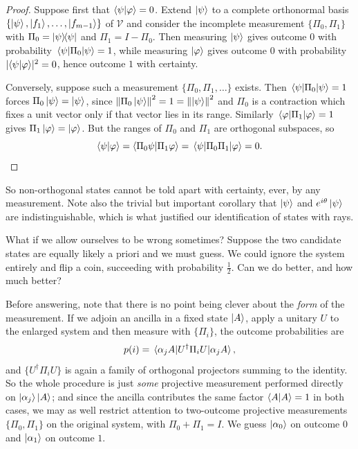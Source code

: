 \documentclass[a4paper]{scrartcl}
\newcommand{\Vs}{\mathcal{V}}
\begin{document}
\begin{proof}
	Suppose first that $\ip{\psi}{\varphi} = 0$. Extend $\ket{\psi}$ to a complete orthonormal basis $\{\ket{\psi}, \ket{f_1},\dots,\ket{f_{m-1}}\}$ of $\Vs$ and consider the incomplete measurement $\{\Pi_0, \Pi_1\}$ with $\Pi_0 = \op{\psi}{\psi}$ and $\Pi_1 = I - \Pi_0$. Then measuring $\ket{\psi}$ gives outcome $0$ with probability $\mel{\psi}{\Pi_0}{\psi} = 1$, while measuring $\ket{\varphi}$ gives outcome $0$ with probability $\abs{\ip{\psi}{\varphi}}^2 = 0$, hence outcome $1$ with certainty.

	Conversely, suppose such a measurement $\{\Pi_0, \Pi_1, \dots\}$ exists. Then $\mel{\psi}{\Pi_0}{\psi} = 1$ forces $\Pi_0\ket{\psi} = \ket{\psi}$, since $\norm{\Pi_0\ket{\psi}}^2 = 1 = \norm{\ket{\psi}}^2$ and $\Pi_0$ is a contraction which fixes a unit vector only if that vector lies in its range. Similarly $\mel{\varphi}{\Pi_1}{\varphi} = 1$ gives $\Pi_1\ket{\varphi} = \ket{\varphi}$. But the ranges of $\Pi_0$ and $\Pi_1$ are orthogonal subspaces, so
	$$\ip{\psi}{\varphi} = \ip{\Pi_0\psi}{\Pi_1\varphi} = \mel{\psi}{\Pi_0\Pi_1}{\varphi} = 0. \qedhere$$
\end{proof}

So non-orthogonal states cannot be told apart with certainty, ever, by any measurement. Note also the trivial but important corollary that $\ket{\psi}$ and $e^{i\theta}\ket{\psi}$ are indistinguishable, which is what justified our identification of states with rays.

What if we allow ourselves to be wrong sometimes? Suppose the two candidate states are equally likely a priori and we must guess. We could ignore the system entirely and flip a coin, succeeding with probability $\tfrac12$. Can we do better, and how much better?

Before answering, note that there is no point being clever about the \emph{form} of the measurement. If we adjoin an ancilla in a fixed state $\ket{A}$, apply a unitary $U$ to the enlarged system and then measure with $\{\Pi_i\}$, the outcome probabilities are
$$p(i) = \mel{\alpha_j A}{U^\dagger \Pi_i U}{\alpha_j A},$$
and $\{U^\dagger \Pi_i U\}$ is again a family of orthogonal projectors summing to the identity. So the whole procedure is just \emph{some} projective measurement performed directly on $\ket{\alpha_j}\ket{A}$; and since the ancilla contributes the same factor $\ip{A}{A} = 1$ in both cases, we may as well restrict attention to two-outcome projective measurements $\{\Pi_0,\Pi_1\}$ on the original system, with $\Pi_0 + \Pi_1 = I$. We guess $\ket{\alpha_0}$ on outcome $0$ and $\ket{\alpha_1}$ on outcome $1$.
\end{document}
